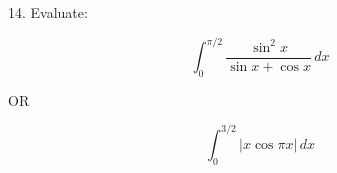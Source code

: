 \documentclass[12pt]{article}
\begin{document}
14. Evaluate:

\[
\int_{0}^{\pi/2} \frac{\sin^2 x}{\sin x + \cos x} \, dx
\]

OR

\[
\int_{0}^{3/2} |x \cos \pi x| \, dx
\]
\end{document}
